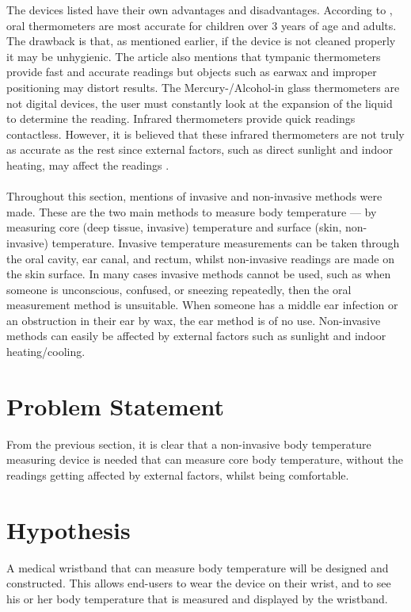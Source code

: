 The devices listed have their own advantages and disadvantages. According to \cite{Whelan2020}, oral thermometers are most accurate for children over 3 years of age and adults. The drawback is that, as mentioned earlier, if the device is not cleaned properly it may be unhygienic. The article also mentions that tympanic thermometers provide fast and accurate readings but objects such as earwax and improper positioning may distort results. The Mercury-/Alcohol-in glass thermometers are not digital devices, the user must constantly look at the expansion of the liquid to determine the reading. Infrared thermometers provide quick readings contactless. However, it is believed that these infrared thermometers are not truly as accurate as the rest since external factors, such as direct sunlight and indoor heating, may affect the readings \cite{Whelan2020}.
\\
\\
Throughout this section, mentions of invasive and non-invasive methods were made. These are the two main methods to measure body temperature — by measuring core (deep tissue, invasive) temperature and surface (skin, non-invasive) temperature. Invasive temperature measurements can be taken through the oral cavity, ear canal, and rectum, whilst non-invasive readings are made on the skin surface. In many cases invasive methods cannot be used, such as when someone is unconscious, confused, or sneezing repeatedly, then the oral measurement method is unsuitable. When someone has a middle ear infection or an obstruction in their ear by wax, the ear method is of no use. Non-invasive methods can easily be affected by external factors such as sunlight and indoor heating/cooling. 
\section{Problem Statement}
From the previous section, it is clear that a non-invasive body temperature measuring device is needed that can measure core body temperature, without the readings getting affected by external factors, whilst being comfortable. 

\section{Hypothesis}
A medical wristband that can measure body temperature will be designed and constructed. This allows end-users to wear the device on their wrist, and to see his or her body temperature that is measured and displayed by the wristband. 


